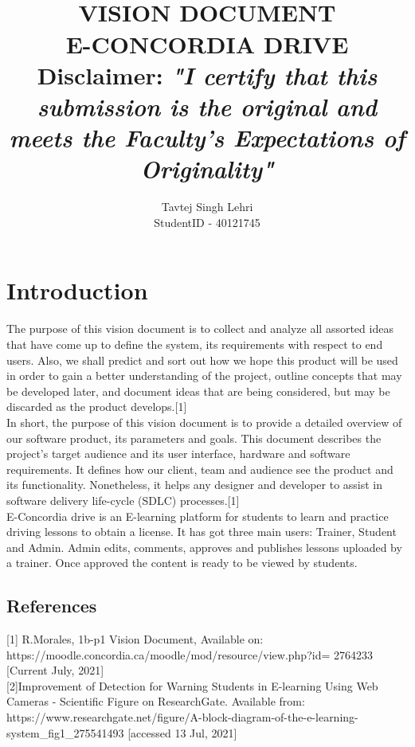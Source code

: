 \documentclass{article}
\title{\normalsize \texts{SOEN 6481 Summer 2021}\\ [1.0cm]
\large \textbf{\uppercase{Vision Document}}\\
\large \textbf{\uppercase{E-Concordia Drive}}
\normalsize \vspace*{2\baselineskip}\\
\textbf{Disclaimer:}
\textit{"I certify that this submission is the original and meets the Faculty's Expectations of Originality"}
}
\author{{Tavtej Singh Lehri}\\
{StudentID - 40121745}}
\begin{document}
\maketitle

\tableofcontents
\clearpage


\section{Introduction}
The purpose of this vision document is to collect and analyze all assorted ideas that have come up to define the system, its requirements with respect to end users. Also, we shall predict and sort out how we hope this product will be used in order to gain a better understanding of the project, outline concepts that may be developed later, and document ideas that are being considered, but may be discarded as the product develops.[1]\normalsize\vspace*{1\baselineskip}\\
In short, the purpose of this vision document is to provide a detailed overview of our software product, its parameters and goals. This document describes the project's target audience and its user interface, hardware and software requirements. It defines how our client, team and audience see the product and its functionality. Nonetheless, it helps any designer and developer to assist in software delivery life-cycle (SDLC) processes.[1]\normalsize\vspace*{1\baselineskip}\\
E-Concordia drive is an E-learning platform for students to learn and practice driving lessons to obtain a license. It has got three main users: Trainer, Student and Admin.
Admin edits, comments, approves and publishes  lessons uploaded by a trainer.
Once approved the content is ready to be viewed by students.

\subsection{References}
[1] R.Morales, 1b-p1 Vision Document, Available on:
https://moodle.concordia.ca/moodle/mod/resource/view.php?id= 2764233 [Current July, 2021]\\

[2]Improvement of Detection for Warning Students in E-learning Using Web Cameras - Scientific Figure on ResearchGate. Available from: https://www.researchgate.net/figure/A-block-diagram-of-the-e-learning-system\_fig1\_275541493 [accessed 13 Jul, 2021]
\end{document}
